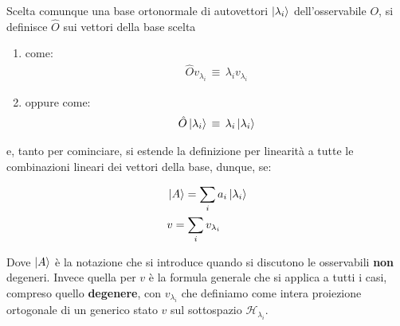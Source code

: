 \begin{mydef}
	Scelta comunque una base ortonormale di autovettori $\ket{\lambda_i}$ dell'osservabile $O$, si definisce $\hat{O}$ sui vettori della base scelta 
\begin{enumerate}
	\item come:
	\begin{align*}
		\hat{O}v_{\lambda_i} \, \equiv \, \lambda_i v_{\lambda_i}
	\end{align*}
	
	\item oppure come:
	\begin{align*}
		\hat{O}\ket{\lambda_i} \, \equiv \, \lambda_i \ket{\lambda_i}
	\end{align*}
	
\end{enumerate}
\end{mydef}
	
	e, tanto per cominciare, si estende la definizione per linearità a tutte le combinazioni lineari dei vettori della base, dunque, se:

\begin{align*}
	 &\ket{A} = \sum_i a_i \ket{\lambda_i}  \\
	 &v = \sum_i v_{\lambda_i}
\end{align*}

	Dove $\ket{A}$ è la notazione che si introduce quando si discutono le osservabili \textbf{non} degeneri. Invece quella per $v$ è la formula generale che si applica a tutti i casi, compreso quello \textbf{degenere}, con $v_{\lambda_i}$ che definiamo come intera proiezione ortogonale di un generico stato $v$ sul sottospazio $\mathcal{H}_{\lambda_i}$.
	
